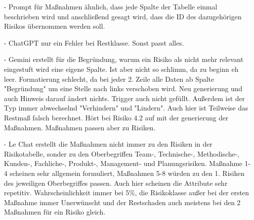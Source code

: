 


- Prompt für Maßnahmen ähnlich, dass jede Spalte der Tabelle einmal beschrieben wird und anschließend gesagt wird, dass die ID des dazugehörigen
Risikos übernommen werden soll.

- ChatGPT nur ein Fehler bei Restklasse. Sonst passt alles.

- Gemini erstellt für die Begründung, warum ein Risiko als nicht mehr relevant eingestuft wird eine eigene Spalte. Ist aber nicht so schlimm, da 
zu beginn eh leer. Formatierung schlecht, da bei jeder 2. Zeile alle Daten ab Spalte "Begründung" um eine Stelle nach links verschoben wird. Neu 
generierung und auch Hinweis darauf ändert nichts. Trigger auch nicht gefüllt. Außerdem ist der Typ immer abwechselnd "Verhindern" und "Lindern".
Auch hier ist Teilweise das Restmaß falsch berechnet. Hört bei Risiko 4.2 auf mit der generierung der Maßnahmen. Maßnahmen passen aber zu Risiken.

- Le Chat erstellt die Maßnahmen nicht immer zu den Risiken in der Risikotabelle, sonder zu den Oberbegriffen Team-, Technische-, Methodische-, 
Kunden-, Fachliche-, Produkt-, Management- und Planungsrisiken. Maßnahme 1-4 scheinen sehr allgemein formuliert, Maßnahmen 5-8 würden
zu den 1. Risiken des jeweiligen Oberbegriffes passen. Auch hier scheinen die Attribute sehr repetitiv. Wahrscheinlichkeit immer bei 5\%,
die Risikoklasse außer bei der ersten Maßnahme immer Unerwünscht und der Restschaden auch meistens bei den 2 Maßnahmen für ein Risiko gleich.

